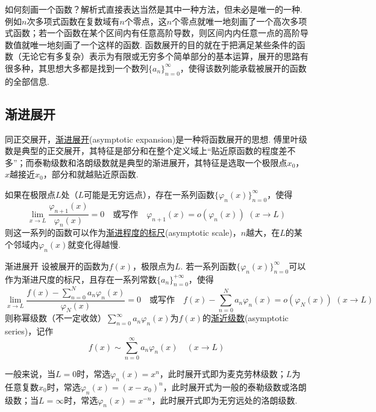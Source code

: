 如何刻画一个函数？解析式直接表达当然是其中一种方法，但未必是唯一的一种. 例如\(n\)次多项式函数在复数域有\(n\)个零点，这\(n\)个零点就唯一地刻画了一个高次多项式函数；若一个函数在某个区间内有任意高阶导数，则区间内内任意一点的高阶导数值就唯一地刻画了一个这样的函数. 函数展开的目的就在于把满足某些条件的函数（无论它有多复杂）表示为有限或无穷多个简单部分的基本运算，展开的思路有很多种，其思想大多都是找到一个数列\(\{a_n\}_{n=0}^{\infty}\)，使得该数列能承载被展开的函数的全部信息.


\subsection{渐进展开}

同正交展开，\uline{渐进展开}(asymptotic expansion)是一种将函数展开的思想. 傅里叶级数是典型的正交展开，其特征是部分和在整个定义域上“贴近原函数的程度差不多”；而泰勒级数和洛朗级数就是典型的渐进展开，其特征是选取一个极限点\(x_0\)，\(x\)越接近\(x_0\)，部分和就越贴近原函数. 

如果在极限点\(L\)处（\(L\)可能是无穷远点），存在一系列函数\(\{\varphi_n(x)\}_{n=0}^{\infty}\)，使得
\[\lim_{x \to L} \frac{\varphi_{n+1}(x)}{\varphi_n(x)} = 0 \quad \mbox{或写作} \quad \varphi_{n+1}(x)=o(\varphi_n(x)) \,\, (x \to L)\]
则这一系列的函数可以作为\uline{渐进程度的标尺}(asymptotic scale)，\(n\)越大，在\(L\)的某个邻域内\(\varphi_n(x)\)就变化得越慢. 

\begin{definition}{渐进展开}
    设被展开的函数为\(f(x)\)，极限点为\(L\). 若一系列函数\(\{\varphi_n(x)\}_{n=0}^{\infty}\)可以作为渐进尺度的标尺，且存在一系列常数\(\{a_n\}_{n=0}^{+\infty}\)，使得
    \[\lim_{x \to L} \frac{f(x) - \displaystyle{\sum_{n=0}^{N}a_n\varphi_n(x)}}{\varphi_N(x)} = 0 \quad \mbox{或写作} \quad f(x) - \sum_{n=0}^{N}a_n\varphi_n(x) = o(\varphi_N(x)) \,\, (x \to L)\]
    则称幂级数（不一定收敛）\(\displaystyle{\sum_{n=0}^{\infty}a_n\varphi_n(x)}\)为\(f(x)\)的\uline{渐近级数}(asymptotic series)，记作
    \[f(x) \sim \sum_{n=0}^{\infty}a_n\varphi_n(x) \quad (x \to L)\]
\end{definition}

一般来说，当\(L=0\)时，常选\(\varphi_n(x)=x^n\)，此时展开式即为麦克劳林级数；\(L\)为任意复数\(x_0\)时，常选\(\varphi_n(x) = (x-x_0)^n\)，此时展开式为一般的泰勒级数或洛朗级数；当\(L=\infty\)时，常选\(\varphi_n(x)=x^{-n}\)，此时展开式即为无穷远处的洛朗级数.

